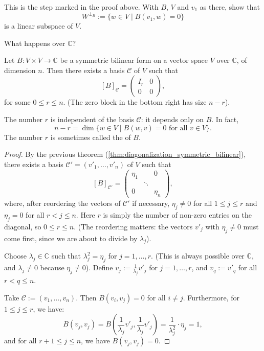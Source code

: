 \begin{exercise}
\label{exc:orthogonal_complement_wrt_B}
This is the step marked  in the proof above. With $B$, $V$ and $v_1$ as there, show that
\[ W^{\perp_B} := \{ w \in V \mid B(v_1, w) = 0 \} \]
is a linear subspace of $V$.
\end{exercise}

\begin{question}
What happens over $\mathbb{C}$?
\end{question}

\begin{theorem}
\label{thm:complex_symmetric_bilinear}
Let $B \colon V \times V \to \mathbb{C}$ be a symmetric bilinear form on a vector space $V$ over $\mathbb{C}$, of dimension $n$. Then there exists a basis $\mathcal{C}$ of $V$ such that
\[
[B]_{\mathcal{C}} = \begin{pmatrix} I_r & 0 \\ 0 & 0 \end{pmatrix},
\]
for some $0 \le r \le n$. (The zero block in the bottom right has size $n - r$).

The number $r$ is independent of the basis $\mathcal{C}$: it depends only on $B$. In fact,
\[
n - r = \dim \{ w \in V \mid B(w, v) = 0 \text{ for all } v \in V \}.
\]
The number $r$ is sometimes called the  of $B$.
\end{theorem}

\begin{proof}
By the previous theorem (\cref{thm:diagonalization_symmetric_bilinear}), there exists a basis $\mathcal{C}' = (v'_1, \dots, v'_n)$ of $V$ such that
\[
[B]_{\mathcal{C}'} = \begin{pmatrix} \eta_1 & & 0 \\ & \ddots & \\ 0 & & \eta_n \end{pmatrix},
\]
where, after reordering the vectors of $\mathcal{C}'$ if necessary, $\eta_j \neq 0$ for all $1 \le j \le r$ and $\eta_j = 0$ for all $r < j \le n$. Here $r$ is simply the number of non-zero entries on the diagonal, so $0 \le r \le n$. (The reordering matters: the vectors $v'_j$ with $\eta_j \neq 0$ must come first, since we are about to divide by $\lambda_j$).

Choose $\lambda_j \in \mathbb{C}$ such that $\lambda_j^2 = \eta_j$ for $j = 1, \dots, r$. (This is always possible over $\mathbb{C}$, and $\lambda_j \neq 0$ because $\eta_j \neq 0$).
Define $v_j := \frac{1}{\lambda_j} v'_j$ for $j = 1, \dots, r$, and $v_q := v'_q$ for all $r < q \le n$.

Take $\mathcal{C} := (v_1, \dots, v_n)$. Then $B(v_i, v_j) = 0$ for all $i \neq j$. Furthermore, for $1 \le j \le r$, we have:
\[
B(v_j, v_j) = B\left(\frac{1}{\lambda_j} v'_j, \frac{1}{\lambda_j} v'_j\right) = \frac{1}{\lambda_j^2} \cdot \eta_j = 1,
\]
and for all $r+1 \le j \le n$, we have $B(v_j, v_j) = 0$.
\end{proof}

